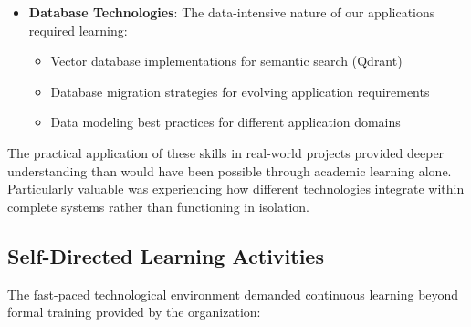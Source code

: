 \documentclass[12pt,a4paper]{article}
\begin{document}
\begin{itemize}
    \item \textbf{Database Technologies}: The data-intensive nature of our applications required learning:
    \begin{itemize}
        \item Vector database implementations for semantic search (Qdrant)
        \item Database migration strategies for evolving application requirements
        \item Data modeling best practices for different application domains
    \end{itemize}
\end{itemize}

The practical application of these skills in real-world projects provided deeper understanding than would have been possible through academic learning alone. Particularly valuable was experiencing how different technologies integrate within complete systems rather than functioning in isolation.

\subsection{Self-Directed Learning Activities}

The fast-paced technological environment demanded continuous learning beyond formal training provided by the organization:
\end{document}
